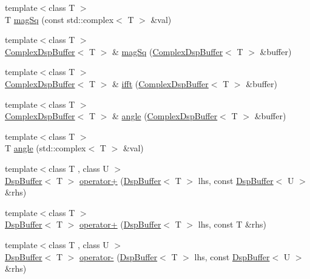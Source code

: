 \begin{DoxyCompactItemize}
\item 
{\footnotesize template$<$class T $>$ }\\T \hyperlink{namespace_smart_dsp_ac3da10e6713da58fbb9f9e37cc186e5c}{mag\+Sq} (const std\+::complex$<$ T $>$ \&val)
\item 
{\footnotesize template$<$class T $>$ }\\\hyperlink{class_smart_dsp_1_1_complex_dsp_buffer}{Complex\+Dsp\+Buffer}$<$ T $>$ \& \hyperlink{namespace_smart_dsp_a37b99bbd908232d4f8572bab4a50b085}{mag\+Sq} (\hyperlink{class_smart_dsp_1_1_complex_dsp_buffer}{Complex\+Dsp\+Buffer}$<$ T $>$ \&buffer)
\item 
{\footnotesize template$<$class T $>$ }\\\hyperlink{class_smart_dsp_1_1_complex_dsp_buffer}{Complex\+Dsp\+Buffer}$<$ T $>$ \& \hyperlink{namespace_smart_dsp_ad3b065609a21ff1d9b9a93c18a831181}{ifft} (\hyperlink{class_smart_dsp_1_1_complex_dsp_buffer}{Complex\+Dsp\+Buffer}$<$ T $>$ \&buffer)
\item 
{\footnotesize template$<$class T $>$ }\\\hyperlink{class_smart_dsp_1_1_complex_dsp_buffer}{Complex\+Dsp\+Buffer}$<$ T $>$ \& \hyperlink{namespace_smart_dsp_a394545da1d47d1af783972c4bf1a5637}{angle} (\hyperlink{class_smart_dsp_1_1_complex_dsp_buffer}{Complex\+Dsp\+Buffer}$<$ T $>$ \&buffer)
\item 
{\footnotesize template$<$class T $>$ }\\T \hyperlink{namespace_smart_dsp_a2bee3c18d2cb73cae86ca1717746a2a0}{angle} (std\+::complex$<$ T $>$ \&val)
\item 
{\footnotesize template$<$class T , class U $>$ }\\\hyperlink{class_smart_dsp_1_1_dsp_buffer}{Dsp\+Buffer}$<$ T $>$ \hyperlink{namespace_smart_dsp_a7c50b5ae78aaf368ca41b928ddee42e6}{operator+} (\hyperlink{class_smart_dsp_1_1_dsp_buffer}{Dsp\+Buffer}$<$ T $>$ lhs, const \hyperlink{class_smart_dsp_1_1_dsp_buffer}{Dsp\+Buffer}$<$ U $>$ \&rhs)
\item 
{\footnotesize template$<$class T $>$ }\\\hyperlink{class_smart_dsp_1_1_dsp_buffer}{Dsp\+Buffer}$<$ T $>$ \hyperlink{namespace_smart_dsp_aea459e2c2f88a2cd329ba522ceefe300}{operator+} (\hyperlink{class_smart_dsp_1_1_dsp_buffer}{Dsp\+Buffer}$<$ T $>$ lhs, const T \&rhs)
\item 
{\footnotesize template$<$class T , class U $>$ }\\\hyperlink{class_smart_dsp_1_1_dsp_buffer}{Dsp\+Buffer}$<$ T $>$ \hyperlink{namespace_smart_dsp_a01d8bcdd434e6ca27f17e1ca6e8dc036}{operator-\/} (\hyperlink{class_smart_dsp_1_1_dsp_buffer}{Dsp\+Buffer}$<$ T $>$ lhs, const \hyperlink{class_smart_dsp_1_1_dsp_buffer}{Dsp\+Buffer}$<$ U $>$ \&rhs)

\end{DoxyCompactItemize}
